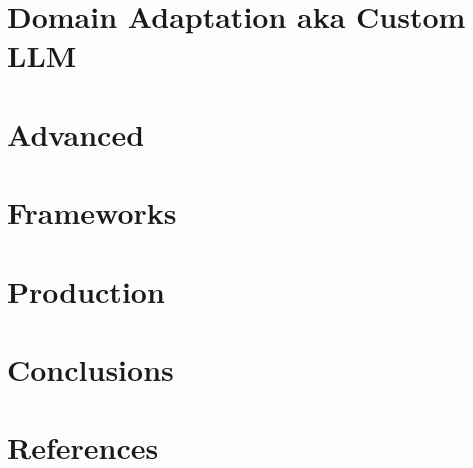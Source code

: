 \section[DA]{Domain Adaptation aka Custom LLM}


\section[Adv]{Advanced}


\section[Frm]{Frameworks}



\section[Prod]{Production}



\section[Concl]{Conclusions}


\section[Refs]{References}


